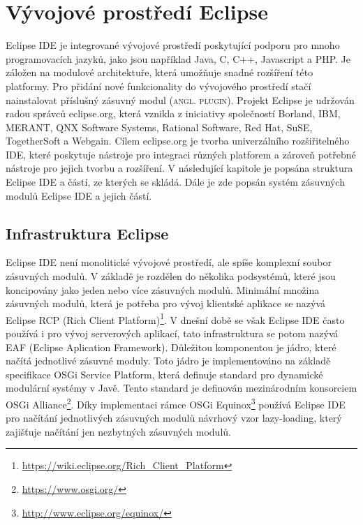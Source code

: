 \chapter{Vývojové prostředí Eclipse}                                      %
Eclipse IDE je integrované vývojové prostředí poskytující podporu pro mnoho programovacích jazyků, jako jsou například Java, C, C++, Javascript a PHP.  Je záložen na modulové architektuře, která umožňuje snadné rozšíření této platformy. Pro přidání nové funkcionality do vývojového prostředí stačí nainstalovat příslušný zásuvný modul (\textsc{angl. plugin}). Projekt Eclipse je udržován radou správců eclipse.org, která vznikla z iniciativy společností Borland, IBM, MERANT, QNX Software Systems, Rational Software, Red Hat, SuSE, TogetherSoft a Webgain. Cílem eclipse.org je tvorba univerzálního rozšiřitelného IDE, které poskytuje nástroje pro integraci různých platforem a zároveň potřebné nástroje pro jejich tvorbu a rozšíření. 
V následující kapitole je popsána struktura Eclipse IDE a částí, ze kterých se skládá. Dále je zde popsán systém zásuvných modulů Eclipse IDE a jejich částí.

  \section{Infrastruktura Eclipse}
  Eclipse IDE není monolitické vývojové prostředí, ale spíše komplexní soubor zásuvných modulů. V základě je rozdělen do několika podsystémů, které jsou koncipovány jako jeden nebo více zásuvných modulů. Minimální množina zásuvných modulů, která je potřeba pro vývoj klientské aplikace se nazývá Eclipse RCP (Rich Client Platform)\footnote{\url{https://wiki.eclipse.org/Rich_Client_Platform}}. V dnešní době se však Eclipse IDE často používá i pro vývoj serverových aplikací, tato infrastruktura se potom nazývá EAF (Eclipse Aplication Framework)\cite{Plugins}. Důležitou komponentou je jádro, které načítá jednotlivé zásuvné moduly. Toto jádro je implementováno na základě specifikace OSGi Service Platform, která definuje standard pro dynamické modulární systémy v Javě. Tento standard je definován mezinárodním konsorciem OSGi Alliance\footnote{\url{https://www.osgi.org/}}. Díky implementaci rámce OSGi Equinox\footnote{\url{http://www.eclipse.org/equinox/}} používá Eclipse IDE pro načítání jednotlivých zásuvných modulů návrhový vzor lazy-loading, který zajišťuje načítání jen nezbytných zásuvných modulů. 
  
